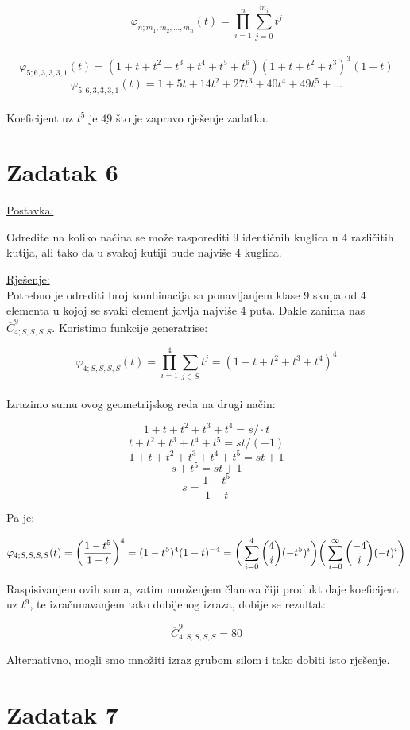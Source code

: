 \documentclass[12pt]{article}
\begin{document}
$$\varphi_{n; m_{1}, m_{2},..., m_{n}}(t) = \prod_{i=1}^{n} \sum_{j=0}^{m_{i}} t^j$$\\
$$\varphi_{5; 6,3,3,3,1}(t) = (1 + t + t^2 + t^3 + t^4 + t^5 + t^6)(1 + t + t^2 + t^3)^3(1 + t)$$
$$\varphi_{5; 6,3,3,3,1}(t) = 1 + 5t + 14t^2 + 27t^3 + 40t^4 + 49t^5 + ...$$\\

Koeficijent uz $t^5$ je $\underline{49}$ što je zapravo rješenje zadatka.
\newpage
\section*{Zadatak 6\label{Z6}}	 

\underline{Postavka:}

Odredite na koliko načina se može rasporediti 9 identičnih kuglica u 4 različitih kutija, ali tako da u svakoj kutiji bude najviše 4 kuglica.

\underline{Rješenje:}\\

Potrebno je odrediti broj kombinacija sa ponavljanjem klase 9 skupa od 4 elementa u kojoj se svaki element javlja najviše 4 puta. Dakle zanima nas $\overline{C}_{4; S,S,S,S}^{9}$. Koristimo funkcije generatrise:

$$\varphi_{4; S,S,S,S}(t) = \prod_{i=1}^4 \sum_{j \in S} t^j = (1 + t + t^2 + t^3 + t^4)^4$$\\

Izrazimo sumu ovog geometrijskog reda na drugi način:

$$1 + t + t^2 + t^3 + t^4 = s / \cdot t$$
$$t + t^2 + t^3 + t^4 + t^5 = st / (+1)$$
$$1 + t + t^2 + t^3 + t^4 + t^5 = st + 1 $$
$$s + t^5 = st + 1$$
$$s = \frac{1-t^5}{1-t}$$

Pa je:

$$\varphi_{4; S,S,S,S}(t) = \bigg(\frac{1-t^5}{1-t}\bigg)^4 = (1 - t^5)^4 (1 - t)^{-4} = \bigg(\sum_{i=0}^{4} \dbinom{4}{i} (-t^5)^i \bigg) \bigg(\sum_{i=0}^{\infty} \dbinom{-4}{i} (-t)^i \bigg)$$

Raspisivanjem ovih suma, zatim množenjem članova čiji produkt daje koeficijent uz $t^9$, te izračunavanjem tako dobijenog izraza, dobije se rezultat:

$$\overline{C}_{4; S,S,S,S}^{9} = 80$$

Alternativno, mogli smo množiti izraz grubom silom i tako dobiti isto rješenje.
\newpage
\section*{Zadatak 7\label{Z7}}	 
\end{document}
